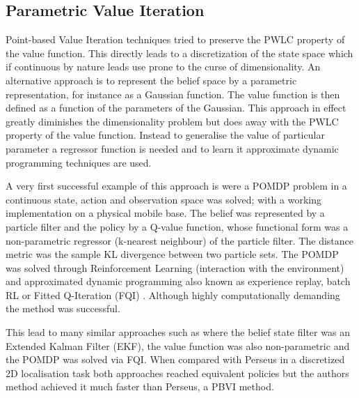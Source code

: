 


\subsection{Parametric Value Iteration}

Point-based Value Iteration techniques tried to preserve the PWLC property of the value function. This directly 
leads to a discretization of the state space which if continuous by nature leads use prone to the curse of dimensionality.
An alternative approach is to represent the belief space by a parametric representation, for instance as a Gaussian function. 
The value function is then defined as a function of the parameters of the Gaussian. This approach in effect greatly 
diminishes the dimensionality problem but does away with the PWLC property of the value function. Instead to generalise 
the value of particular parameter a regressor function is needed and to learn it approximate dynamic programming techniques 
are used.

A very first successful example of this approach is \cite{MC-POMDP} were a POMDP problem in a continuous 
state, action and observation space was solved; with a working implementation on a physical mobile base.  
The belief was represented by a particle filter and the policy by a Q-value function, whose functional form was 
a non-parametric regressor (k-nearest neighbour) of the particle filter. The distance metric was the sample KL divergence
between two particle sets. The POMDP was solved through Reinforcement Learning (interaction with the environment) and 
approximated dynamic programming also known as experience replay, batch RL or Fitted Q-Iteration (FQI) \cite{Tree_batch_2005}. 
Although highly computationally demanding the method was successful. 

This lead to many similar approaches such as \cite{mc_update_ppomdps} where the belief state filter was an 
Extended Kalman Filter (EKF), the value function was also non-parametric and the POMDP was solved via FQI. 
When compared with Perseus in a discretized 2D localisation task both approaches reached equivalent 
policies but the authors method achieved it much faster than Perseus, a PBVI method. 

